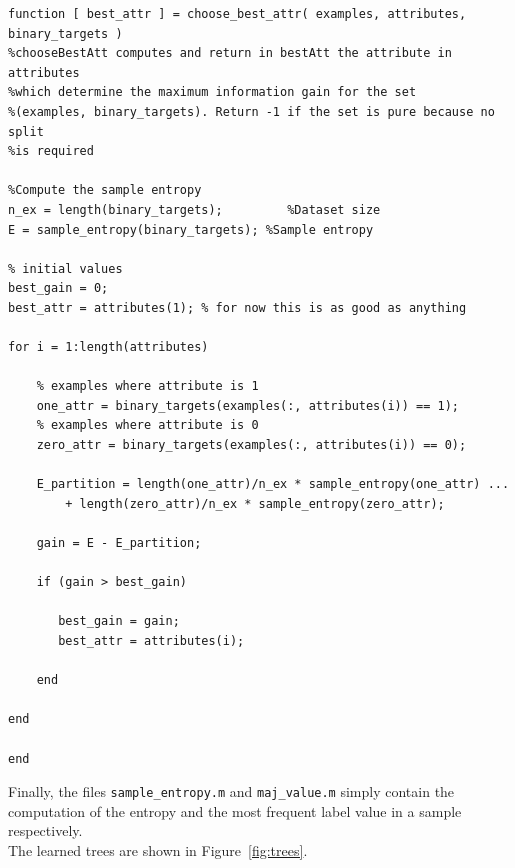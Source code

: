 \documentclass{article}
\begin{document}
\begin{lstlisting}
function [ best_attr ] = choose_best_attr( examples, attributes, binary_targets )
%chooseBestAtt computes and return in bestAtt the attribute in attributes
%which determine the maximum information gain for the set 
%(examples, binary_targets). Return -1 if the set is pure because no split
%is required

%Compute the sample entropy
n_ex = length(binary_targets);         %Dataset size
E = sample_entropy(binary_targets); %Sample entropy

% initial values
best_gain = 0;
best_attr = attributes(1); % for now this is as good as anything
    
for i = 1:length(attributes)
       
    % examples where attribute is 1
    one_attr = binary_targets(examples(:, attributes(i)) == 1); 
    % examples where attribute is 0
    zero_attr = binary_targets(examples(:, attributes(i)) == 0);
        
    E_partition = length(one_attr)/n_ex * sample_entropy(one_attr) ...
        + length(zero_attr)/n_ex * sample_entropy(zero_attr);
        
    gain = E - E_partition;
        
    if (gain > best_gain)
            
       best_gain = gain;
       best_attr = attributes(i);
        
    end
        
end

end

\end{lstlisting}
Finally, the files \verb$sample_entropy.m$ and \verb$maj_value.m$ simply contain the computation of the entropy and the most frequent label value in a sample respectively.\\
The learned trees are shown in Figure~\ref{fig:trees}.
\end{document}
